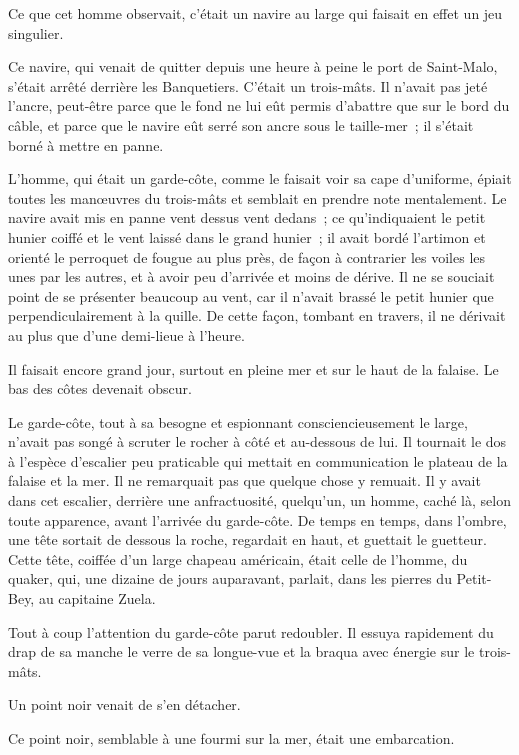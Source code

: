 \documentclass[french,twoside]{book} %
\begin{document}
Ce que cet homme observait, c’était un navire au large qui faisait en effet un jeu singulier.\par
Ce navire, qui venait de quitter depuis une heure à peine le port de Saint-Malo, s’était arrêté derrière les Banquetiers. C’était un trois-mâts. Il n’avait pas jeté l’ancre, peut-être parce que le fond ne lui eût permis  d’abattre que sur le bord du câble, et parce que le navire eût serré son ancre sous le taille-mer ; il s’était borné à mettre en panne.\par
L’homme, qui était un garde-côte, comme le faisait voir sa cape d’uniforme, épiait toutes les manœuvres du trois-mâts et semblait en prendre note mentalement. Le navire avait mis en panne vent dessus vent dedans ; ce qu’indiquaient le petit hunier coiffé et le vent laissé dans le grand hunier ; il avait bordé l’artimon et orienté le perroquet de fougue au plus près, de façon à contrarier les voiles les unes par les autres, et à avoir peu d’arrivée et moins de dérive. Il ne se souciait point de se présenter beaucoup au vent, car il n’avait brassé le petit hunier que perpendiculairement à la quille. De cette façon, tombant en travers, il ne dérivait au plus que d’une demi-lieue à l’heure.\par
Il faisait encore grand jour, surtout en pleine mer et sur le haut de la falaise. Le bas des côtes devenait obscur.\par
Le garde-côte, tout à sa besogne et espionnant consciencieusement le large, n’avait pas songé à scruter le rocher à côté et au-dessous de lui. Il tournait le dos à l’espèce d’escalier peu praticable qui mettait en communication le plateau de la falaise et la mer. Il ne remarquait pas que quelque chose y remuait. Il y avait dans cet escalier, derrière une anfractuosité, quelqu’un, un homme, caché là, selon toute apparence, avant l’arrivée du garde-côte. De temps en temps, dans l’ombre, une tête sortait de dessous la roche, regardait en haut, et guettait le guetteur. Cette tête,  coiffée d’un large chapeau américain, était celle de l’homme, du quaker, qui, une dizaine de jours auparavant, parlait, dans les pierres du Petit-Bey, au capitaine Zuela.\par
Tout à coup l’attention du garde-côte parut redoubler. Il essuya rapidement du drap de sa manche le verre de sa longue-vue et la braqua avec énergie sur le trois-mâts.\par
Un point noir venait de s’en détacher.\par
Ce point noir, semblable à une fourmi sur la mer, était une embarcation.\par
\end{document}
